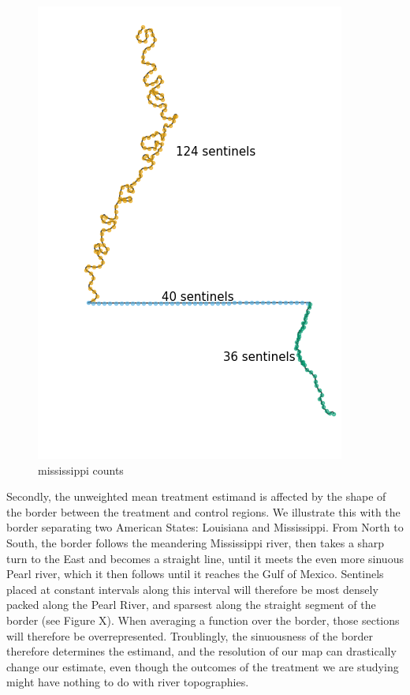 \documentclass[letter]{article}
\makeatletter
\def\maxwidth{\ifdim\Gin@nat@width>\linewidth\linewidth
    \else\Gin@nat@width\fi}
\let\Oldincludegraphics\includegraphics
\renewcommand{\includegraphics}[1]{\Oldincludegraphics[width=.8\maxwidth]{#1}}
\makeatother
\begin{document}
\begin{figure}
\centering
\includegraphics{figures/mississippi_counts.png}
\caption{mississippi counts}
\end{figure}

Secondly, the unweighted mean treatment estimand is affected by the
shape of the border between the treatment and control regions. We
illustrate this with the border separating two American States:
Louisiana and Mississippi. From North to South, the border follows the
meandering Mississippi river, then takes a sharp turn to the East and
becomes a straight line, until it meets the even more sinuous Pearl
river, which it then follows until it reaches the Gulf of Mexico.
Sentinels placed at constant intervals along this interval will
therefore be most densely packed along the Pearl River, and sparsest
along the straight segment of the border (see Figure X). When averaging
a function over the border, those sections will therefore be
overrepresented. Troublingly, the sinuousness of the border therefore
determines the estimand, and the resolution of our map can drastically
change our estimate, even though the outcomes of the treatment we are
studying might have nothing to do with river topographies.
\end{document}
